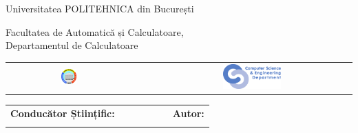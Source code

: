 \begin{titlepage}
	\begin{center}
		{\Large Universitatea POLITEHNICA din București}
		\par\vspace*{2mm}
		{\Large Facultatea de Automatică și Calculatoare,\\
		 Departamentul de Calculatoare}
		\par\vspace*{3mm}
		\begin{table}[h]
        	\begin{center}
				\begin{tabular}{cccc}
                    \includegraphics[width=0.13\textwidth]{src/img/branding/upb}
					& & &
					\includegraphics[width=0.30\textwidth]{src/img/branding/cs}
            	\end{tabular}
			\end{center}
		\end{table}
		
		\VARtitlespacing
		\VARthesiscaption
		\par\vspace*{15mm}
		{\Huge \VARtitlero}
		\VARtitlespacing

		\begin{table}[h]
        	\begin{center}
				\begin{tabular}{lcccccl}
					\Large \textbf{\Large Conducător Științific:}
					\vspace*{1mm} &&&&&& \Large \textbf{\Large Autor:}\vspace*{1mm} \\
					\Large \VARadviser &&&&&& \Large \VARauthor
				\end{tabular}
			\end{center}
		\end{table}

		\par\vspace*{30mm}
		\Large \VARtitlefooterro
	\end{center}
\end{titlepage}
